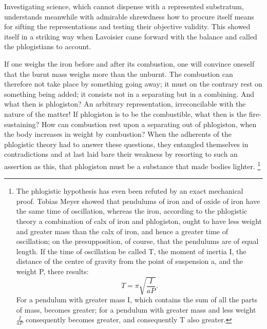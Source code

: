 \documentclass[12pt,a4paper]{book}
\begin{document}
Investigating science, which cannot dispense with a represented substratum, understands meanwhile with admirable
shrewdness how to procure itself means for sifting the representations and testing their objective validity. This showed
itself in a striking way when Lavoisier came forward with the balance and called the phlogistians to account.

If one weighs the iron before and after its combustion, one will convince oneself that the burnt mass weighs more than
the unburnt. The combustion can therefore not take place by something going away; it must on the contrary rest on
something being added; it consists not in a separating but in a combining. And what then is phlogiston? An arbitrary
representation, irreconcilable with the nature of the matter! If phlogiston is to be the combustible, what then is the
fire-sustaining? How can combustion rest upon a separating out of phlogiston, when the body increases in weight by
combustion? When the adherents of the phlogistic theory had to answer these questions, they entangled themselves in
contradictions and at last laid bare their weakness by resorting to such an assertion as
this, that phlogiston must be a substance that made bodies lighter.%
\footnote{%
The phlogistic hypothesis has even been refuted by an exact mechanical proof. Tobias Meyer showed that pendulums of iron
and of oxide of iron have the same time of oscillation, whereas the iron, according to the phlogistic theory a
combination of calx of iron and phlogiston, ought to have less weight and greater mass than the calx of iron, and hence a
greater time of oscillation; on the presupposition, of course, that the pendulums are of equal length. If the time of
oscillation be called T, the moment of inertia I, the distance of the centre of gravity from the point of suspension a,
and the weight P, there results:
\[ T = \pi \sqrt{\frac{I}{aP}}. \]
For a pendulum with greater mass I, which contains the sum of all the parts of mass, becomes greater; for a pendulum with
greater mass and less weight $\frac{I}{aP}$ consequently becomes greater, and consequently T also greater.}
\end{document}
